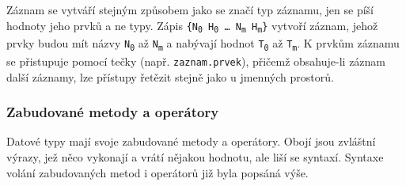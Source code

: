 \documentclass[a4paper,12pt]{article}
\begin{document}
Záznam se vytváří stejným způsobem jako se značí typ záznamu, jen se píší hodnoty jeho prvků a ne typy. Zápis \texttt{\{N\textsubscript{0} H\textsubscript{0} \ldots{} N\textsubscript{m} H\textsubscript{m}\}} vytvoří záznam, jehož prvky budou mít názvy \texttt{N\textsubscript{0}} až \texttt{N\textsubscript{m}} a nabývají hodnot \texttt{T\textsubscript{0}} až \texttt{T\textsubscript{m}}. K prvkům záznamu se přistupuje pomocí tečky (např. \texttt{zaznam.prvek}), přičemž obsahuje-li záznam další záznamy, lze přístupy řetězit stejně jako u jmenných prostorů.

\subsubsection{Zabudované metody a operátory}
Datové typy mají svoje zabudované metody a operátory. Obojí jsou zvláštní výrazy, jež něco vykonají a vrátí nějakou hodnotu, ale liší se syntaxí. Syntaxe volání zabudovaných metod i operátorů již byla popsáná výše.
\end{document}
